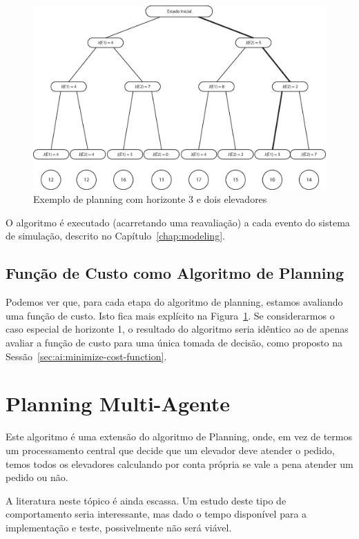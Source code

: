 \begin{figure}[htb!]
  \centering
  \includegraphics[scale=0.6]{img/planning.eps}
  \caption{Exemplo de planning com horizonte 3 e dois elevadores}
\label{fig:planning}
\end{figure}

O algoritmo é executado (acarretando uma reavaliação) a cada evento do sistema
de simulação, descrito no Capítulo~\ref{chap:modeling}.

\subsection{Função de Custo como Algoritmo de Planning}

Podemos ver que, para cada etapa do algoritmo de planning, estamos avaliando uma
função de custo. Isto fica mais explícito na Figura~\ref{fig:planning}. Se
considerarmos o caso especial de horizonte 1, o resultado do algoritmo seria
idêntico ao de apenas avaliar a função de custo para uma única tomada de
decisão, como proposto na Sessão~\ref{sec:ai:minimize-cost-function}.

\section{Planning Multi-Agente}

Este algoritmo é uma extensão do algoritmo de Planning, onde, em vez de termos
um processamento central que decide que um elevador deve atender o pedido, temos
todos os elevadores calculando por conta própria se vale a pena atender um
pedido ou não.

A literatura neste tópico é ainda escassa. Um estudo deste tipo de
comportamento seria interessante, mas dado o tempo disponível para a
implementação e teste, possivelmente não será viável.

